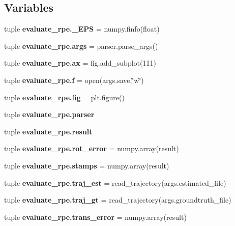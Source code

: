 \subsection*{\-Variables}
\begin{DoxyCompactItemize}
\item 
tuple {\bf evaluate\-\_\-rpe.\-\_\-\-E\-P\-S} = numpy.\-finfo(float)
\item 
tuple {\bf evaluate\-\_\-rpe.\-args} = parser.\-parse\-\_\-args()
\item 
tuple {\bf evaluate\-\_\-rpe.\-ax} = fig.\-add\-\_\-subplot(111)
\item 
tuple {\bf evaluate\-\_\-rpe.\-f} = open(args.\-save,\char`\"{}w\char`\"{})
\item 
tuple {\bf evaluate\-\_\-rpe.\-fig} = plt.\-figure()
\item 
tuple {\bf evaluate\-\_\-rpe.\-parser}
\item 
tuple {\bf evaluate\-\_\-rpe.\-result}
\item 
tuple {\bf evaluate\-\_\-rpe.\-rot\-\_\-error} = numpy.\-array(result)
\item 
tuple {\bf evaluate\-\_\-rpe.\-stamps} = numpy.\-array(result)
\item 
tuple {\bf evaluate\-\_\-rpe.\-traj\-\_\-est} = read\-\_\-trajectory(args.\-estimated\-\_\-file)
\item 
tuple {\bf evaluate\-\_\-rpe.\-traj\-\_\-gt} = read\-\_\-trajectory(args.\-groundtruth\-\_\-file)
\item 
tuple {\bf evaluate\-\_\-rpe.\-trans\-\_\-error} = numpy.\-array(result)
\end{DoxyCompactItemize}
